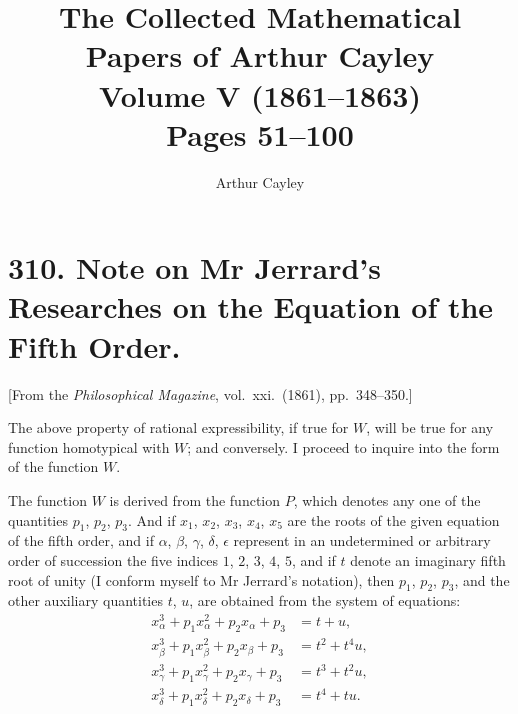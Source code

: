 \documentclass[11pt,a4paper]{article}
\title{\textbf{The Collected Mathematical Papers of Arthur Cayley}\\[6pt]
\Large Volume V (1861--1863)\\[12pt]
\large Pages 51--100}
\author{Arthur Cayley}
\date{}
\theoremstyle{plain}
\begin{document}
\maketitle
\thispagestyle{empty}
\newpage
\setcounter{page}{51}


\section*{310. Note on Mr Jerrard's Researches on the Equation of the Fifth Order.}

[From the \textit{Philosophical Magazine}, vol.\ xxi.\ (1861), pp.\ 348--350.]

\medskip

The above property of rational expressibility, if true for $W$, will be true for any function homotypical with $W$; and conversely. I proceed to inquire into the form of the function $W$.

The function $W$ is derived from the function $P$, which denotes any one of the quantities $p_1$, $p_2$, $p_3$. And if $x_1$, $x_2$, $x_3$, $x_4$, $x_5$ are the roots of the given equation of the fifth order, and if $\alpha$, $\beta$, $\gamma$, $\delta$, $\epsilon$ represent in an undetermined or arbitrary order of succession the five indices $1$, $2$, $3$, $4$, $5$, and if $t$ denote an imaginary fifth root of unity (I conform myself to Mr Jerrard's notation), then $p_1$, $p_2$, $p_3$, and the other auxiliary quantities $t$, $u$, are obtained from the system of equations:
\begin{align*}
x_\alpha^3 + p_1 x_\alpha^2 + p_2 x_\alpha + p_3 &= t + u, \\
x_\beta^3 + p_1 x_\beta^2 + p_2 x_\beta + p_3 &= t^2 + t^4 u, \\
x_\gamma^3 + p_1 x_\gamma^2 + p_2 x_\gamma + p_3 &= t^3 + t^2 u, \\
x_\delta^3 + p_1 x_\delta^2 + p_2 x_\delta + p_3 &= t^4 + t u.
\end{align*}
\end{document}
